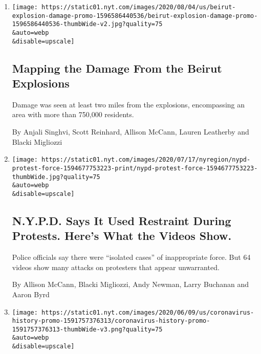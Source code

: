 \begin{enumerate}
\def\labelenumi{\arabic{enumi}.}
\item
  \href{/interactive/2020/08/04/world/middleeast/beirut-explosion-damage.html}{}

  \texttt{[image: https://static01.nyt.com/images/2020/08/04/us/beirut-explosion-damage-promo-1596586440536/beirut-explosion-damage-promo-1596586440536-thumbWide-v2.jpg?quality=75\\\&auto=webp\\\&disable=upscale]}

  \hypertarget{mapping-the-damage-from-the-beirut-explosions}{%
  \subsection{Mapping the Damage From the Beirut
  Explosions}\label{mapping-the-damage-from-the-beirut-explosions}}

  Damage was seen at least two miles from the explosions, encompassing
  an area with more than 750,000 residents.

  By Anjali Singhvi, Scott Reinhard, Allison McCann, Lauren Leatherby
  and Blacki Migliozzi
\item
  \href{/interactive/2020/07/14/nyregion/nypd-george-floyd-protests.html}{}

  \texttt{[image: https://static01.nyt.com/images/2020/07/17/nyregion/nypd-protest-force-1594677753223-print/nypd-protest-force-1594677753223-thumbWide.jpg?quality=75\\\&auto=webp\\\&disable=upscale]}

  \hypertarget{nypd-says-it-used-restraint-during-protests-heres-what-the-videos-show}{%
  \subsection{N.Y.P.D. Says It Used Restraint During Protests. Here's
  What the Videos
  Show.}\label{nypd-says-it-used-restraint-during-protests-heres-what-the-videos-show}}

  Police officials say there were ``isolated cases'' of inappropriate
  force. But 64 videos show many attacks on protesters that appear
  unwarranted.

  By Allison McCann, Blacki Migliozzi, Andy Newman, Larry Buchanan and
  Aaron Byrd
\item
  \href{/interactive/2020/06/10/world/coronavirus-history.html}{}

  \texttt{[image: https://static01.nyt.com/images/2020/06/09/us/coronavirus-history-promo-1591757376313/coronavirus-history-promo-1591757376313-thumbWide-v3.png?quality=75\\\&auto=webp\\\&disable=upscale]}


\end{enumerate}
